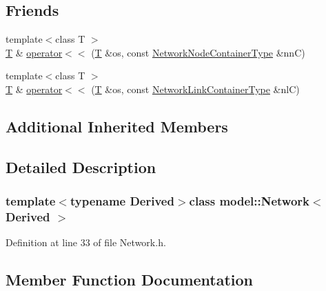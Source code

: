 \subsection*{Friends}
\begin{DoxyCompactItemize}
\item 
{\footnotesize template$<$class T $>$ }\\\hyperlink{_spline_node_base__corder1_8h_a82692d3a5502b91460591f1d5504314a}{T} \& \hyperlink{classmodel_1_1_network_a0010acc7c3328adb3893270d09d583e6}{operator$<$$<$} (\hyperlink{_spline_node_base__corder1_8h_a82692d3a5502b91460591f1d5504314a}{T} \&os, const \hyperlink{_network_typedefs_8h_a40e460ba3daf60653243011fc1229d3f}{Network\+Node\+Container\+Type} \&nn\+C)
\item 
{\footnotesize template$<$class T $>$ }\\\hyperlink{_spline_node_base__corder1_8h_a82692d3a5502b91460591f1d5504314a}{T} \& \hyperlink{classmodel_1_1_network_a1d36557954de5adbb3fc4a1bd6fa6d91}{operator$<$$<$} (\hyperlink{_spline_node_base__corder1_8h_a82692d3a5502b91460591f1d5504314a}{T} \&os, const \hyperlink{_network_typedefs_8h_af4cdb44a5a1a723dcf8f4350cf689565}{Network\+Link\+Container\+Type} \&nl\+C)
\end{DoxyCompactItemize}
\subsection*{Additional Inherited Members}


\subsection{Detailed Description}
\subsubsection*{template$<$typename Derived$>$class model\+::\+Network$<$ Derived $>$}



Definition at line 33 of file Network.\+h.



\subsection{Member Function Documentation}
\hypertarget{classmodel_1_1_network_af48273eaacbb592fb063b3f55314b1fb}{}
